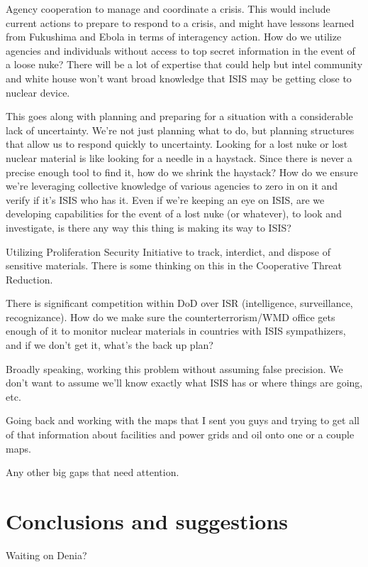 \documentclass{report}
\begin{document}
Agency cooperation to manage and coordinate a crisis. This would include current actions to prepare to respond to a crisis, and might have lessons learned from Fukushima and Ebola in terms of interagency action. How do we utilize agencies and individuals without access to top secret information in the event of a loose nuke? There will be a lot of expertise that could help but intel community and white house won't want broad knowledge that ISIS may be getting close to nuclear device. 

This goes along with planning and preparing for a situation with a considerable lack of uncertainty. We're not just planning what to do, but planning structures that allow us to respond quickly to uncertainty. Looking for a lost nuke or lost nuclear material is like looking for a needle in a haystack. Since there is never a precise enough tool to find it, how do we shrink the haystack? How do we ensure we're leveraging collective knowledge of various agencies to zero in on it and verify if it's ISIS who has it. Even if we're keeping an eye on ISIS, are we developing capabilities for the event of a lost nuke (or whatever), to look and investigate, is there any way this thing is making its way to ISIS?

Utilizing Proliferation Security Initiative to track, interdict, and dispose of sensitive materials. There is some thinking on this in the Cooperative Threat Reduction.

There is significant competition within DoD over ISR (intelligence, surveillance, recognizance). How do we make sure the counterterrorism/WMD office gets enough of it to monitor nuclear materials in countries with ISIS sympathizers, and if we don't get it, what's the back up plan?

Broadly speaking, working this problem without assuming false precision. We don't want to assume we'll know exactly what ISIS has or where things are going, etc.

Going back and working with the maps that I sent you guys and trying to get all of that information about facilities and power grids and oil onto one or a couple maps. 

Any other big gaps that need attention.



\chapter{Conclusions and suggestions }

Waiting on Denia?



\newpage



\thispagestyle{fancyTOC}
\end{document}
